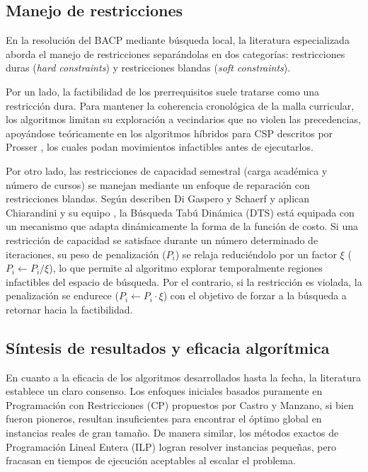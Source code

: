 \documentclass[letter, 10pt]{article}
\begin{document}
\subsection{Manejo de restricciones}

En la resoluci\'on del BACP mediante b\'usqueda local, la literatura especializada aborda el manejo de restricciones separ\'andolas en dos categor\'ias: restricciones duras (\textit{hard constraints}) y restricciones blandas (\textit{soft constraints}).

Por un lado, la factibilidad de los prerrequisitos suele tratarse como una restricci\'on dura. Para mantener la coherencia cronol\'ogica de la malla curricular, los algoritmos limitan su exploraci\'on a vecindarios que no violen las precedencias, apoy\'andose te\'oricamente en los algoritmos h\'ibridos para CSP descritos por Prosser \cite{Prosser93Hybrid}, los cuales podan movimientos infactibles antes de ejecutarlos.

Por otro lado, las restricciones de capacidad semestral (carga acad\'emica y n\'umero de cursos) se manejan mediante un enfoque de reparaci\'on con restricciones blandas. Seg\'un describen Di Gaspero y Schaerf \cite{digaspero2008} y aplican Chiarandini y su equipo \cite{Chiarandini2012}, la B\'usqueda Tab\'u Din\'amica (DTS) est\'a equipada con un mecanismo que adapta din\'amicamente la forma de la funci\'on de costo. Si una restricci\'on de capacidad se satisface durante un n\'umero determinado de iteraciones, su peso de penalizaci\'on ($P_i$) se relaja reduci\'endolo por un factor $\xi$ ($P_i \leftarrow P_i/\xi$), lo que permite al algoritmo explorar temporalmente regiones infactibles del espacio de b\'usqueda. Por el contrario, si la restricci\'on es violada, la penalizaci\'on se endurece ($P_i \leftarrow P_i \cdot \xi$) con el objetivo de forzar a la b\'usqueda a retornar hacia la factibilidad.


\subsection{S\'intesis de resultados y eficacia algor\'itmica}
En cuanto a la eficacia de los algoritmos desarrollados hasta la fecha, la literatura establece un claro consenso. Los enfoques iniciales basados puramente en Programaci\'on con Restricciones (CP) propuestos por Castro y Manzano, si bien fueron pioneros, resultan insuficientes para encontrar el \'optimo global en instancias reales de gran tama\~no. De manera similar, los m\'etodos exactos de Programaci\'on Lineal Entera (ILP) logran resolver instancias peque\~nas, pero fracasan en tiempos de ejecuci\'on aceptables al escalar el problema. 
\end{document}
